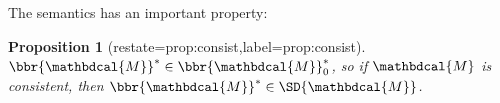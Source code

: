 \documentclass{article}
\theoremstyle{plain}
\newtheorem{prop}[theorem]{Proposition}
\theoremstyle{definition}
\theoremstyle{remark}
\DeclareMathOperator*{\argmin}{arg\;min}
\newcommand{\commentout}[1]{\ignorespaces}
\newcommand{\V}{\mathcal V}
\newcommand{\dg}[1]{\mathbdcal{#1}}
\newcommand{\begthm}[2]{\begin{#1}[restate=#2,label=#2]}
\numberwithin{equation}{section}
\begin{document}
\commentout{
\begin{prop}\label{prop:convex-if-gamma-small}
  If $\dg M$ is a PDG and
  $\gamma < \min_L \beta_L^{\dg M}$, then
  $\bbr{\dg M}_\gamma$ is a strictly convex function of $\mu$.%
\end{prop}

                          
                          
\Cref{prop:convex-if-gamma-small} allows us to define our desired
semantics by ensuring the limit%
	\footnote{$\mu$ is in this limit iff there is a sequence $(\gamma_i, \mu_i)_{i \in \mathbb N}$ with $\gamma_i \to 0$ and $\mu_i \to \mu$ such that $\mu_i \in \bbr{\dg M}_{\gamma_i}$ for all $i$.}
 in \eqref{eq:uniqdist} is well-defined.
	
	\begin{equation}
		 \bbr{\dg M}_* := \lim_{\gamma\to 0^+}\argmin_{\mu \in
				   \Delta\V(\dg M)} \bbr{\dg M}_\gamma(\mu). 
		   \label{eq:uniqdist}
	\end{equation}
}
The semantics has an important property: 
\begthm{prop}{prop:consist}
$\bbr{\dg M}^* \in \bbr{\dg M}_0^*$, so if $\dg M$ is consistent,
then $\bbr{\dg M}^* \in \SD{\dg  M}$.
\end{prop}

\end{document}
